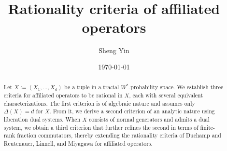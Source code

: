 \documentclass[11pt,reqno]{amsart}
\title[Rationality criteria]{Rationality criteria of affiliated operators}
\author{Sheng Yin}
\date{\today}
\theoremstyle{definition}
\theoremstyle{remark}
\begin{document}
\begin{abstract}
Let $X:=(X_1,\ldots,X_d)$ be a tuple in a tracial $W^*$-probability space.
We establish three criteria for affiliated operators to be rational in $X$, each with several equivalent characterizations.
The first criterion is of algebraic nature and assumes only $\Delta(X)=d$ for $X$.
From it, we derive a second criterion of an analytic nature using liberation dual systems.
When $X$ consists of normal generators and admits a dual system, we obtain a third criterion that further refines the second in terms of finite-rank fraction commutators, thereby extending the rationality criteria of Duchamp and Reutenauer, Linnell, and Miyagawa for affiliated operators.
\end{abstract}
\maketitle








\end{document}
